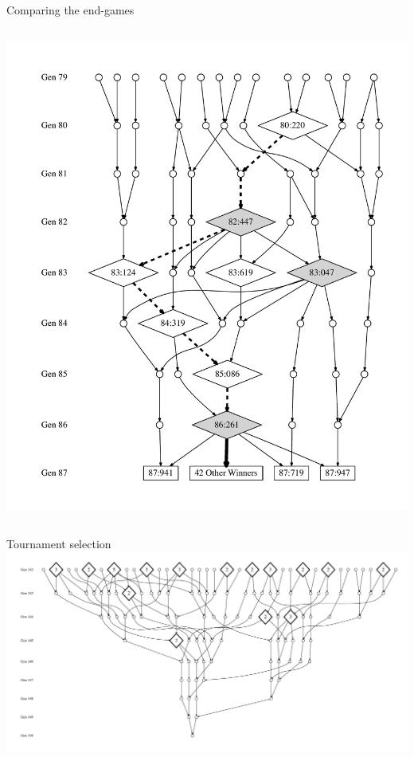 \documentclass{beamer}
\begin{document}
\begin{frame}{Comparing the end-games}
\begin{columns}
\begin{column}{0.5 \linewidth}
\begin{center}
				\includegraphics[width=\linewidth]{Figures/ancestors_of_winners_colons}
			\end{center}
		\end{column}
	\end{columns}
\end{frame}

\begin{frame}{Tournament selection}
	\includegraphics[width=\linewidth]{Figures/ancestors_of_winner_rswn_tourney_run74_9gens}
\end{frame}
\end{document}
